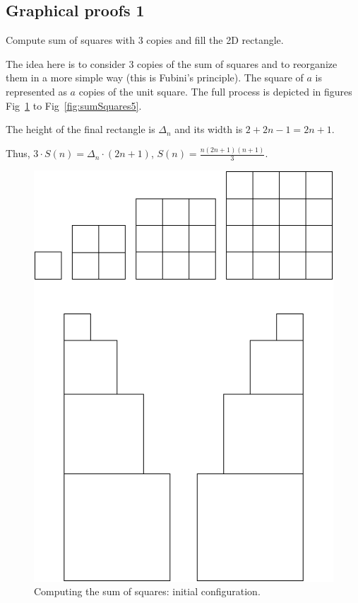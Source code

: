 \subsection{Graphical proofs 1}

Compute sum of squares with 3 copies and fill the 2D rectangle. 

The idea here is to consider $3$ copies of the sum of squares and to reorganize them in a more simple way 
(this is Fubini's principle).
The square of $a$ is represented as $a$ copies of the unit square.
The full process is depicted in figures Fig~\ref{fig:sumSquares1} to Fig~\ref{fig:sumSquares5}.

The height of the final rectangle is $\Delta_ n$ and its width is $2+2n-1=2n+1$. 

Thus, $3 \cdot S(n) = \Delta_n \cdot (2n+1)$, $S(n) = \frac{n(2n+1)(n+1)}{3}$.
\begin{figure}[ht]
\begin{center}
       \includegraphics[scale=0.4]{FiguresMaths/SumSquares1}
\caption{Computing the sum of squares: initial configuration.}
       \label{fig:sumSquares1}
\end{center}
\end{figure}
